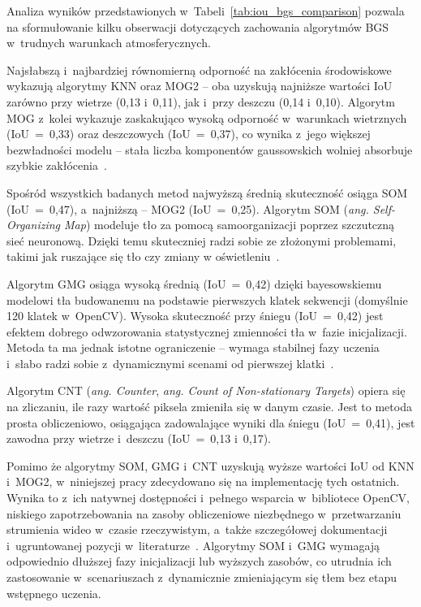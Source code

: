 Analiza wyników przedstawionych w~Tabeli~\ref{tab:iou_bgs_comparison} pozwala na sformułowanie
kilku obserwacji dotyczących zachowania algorytmów BGS w~trudnych warunkach atmosferycznych.

Najsłabszą i~najbardziej równomierną odporność na zakłócenia środowiskowe wykazują algorytmy KNN
oraz MOG2 -- oba uzyskują najniższe wartości IoU zarówno przy wietrze (0,13 i~0,11), jak i~przy
deszczu (0,14 i~0,10). Algorytm MOG z~kolei wykazuje zaskakująco wysoką odporność w~warunkach
wietrznych (IoU~=~0,33) oraz deszczowych (IoU~=~0,37), co wynika z~jego większej bezwładności
modelu -- stała liczba komponentów gaussowskich wolniej absorbuje szybkie
zakłócenia~\cite{stauffer1999}.

Spośród wszystkich badanych metod najwyższą średnią skuteczność osiąga SOM (IoU~=~0,47),
a~najniższą -- MOG2 (IoU~=~0,25). Algorytm SOM (\textit{ang. Self-Organizing Map}) modeluje tło za
pomocą samoorganizacji poprzez szczutczną sieć neuronową\cite{karbowiak2022}. Dzięki temu
skuteczniej radzi sobie ze złożonymi problemami, takimi jak ruszające się tło czy zmiany w
oświetleniu~\cite{karbowiak2022}.

Algorytm GMG osiąga wysoką średnią (IoU~=~0,42) dzięki bayesowskiemu modelowi tła budowanemu na
podstawie pierwszych klatek sekwencji (domyślnie 120 klatek w~OpenCV). Wysoka skuteczność przy
śniegu (IoU~=~0,42) jest efektem dobrego odwzorowania statystycznej zmienności tła w~fazie
inicjalizacji. Metoda ta ma jednak istotne ograniczenie -- wymaga stabilnej fazy uczenia i~słabo
radzi sobie z~dynamicznymi scenami od pierwszej klatki~\cite{karbowiak2022}.

Algorytm CNT (\textit{ang. Counter}, \textit{ang. Count of Non-stationary Targets}) opiera się na
zliczaniu, ile razy wartość piksela zmieniła się w danym czasie. Jest to metoda prosta
obliczeniowo, osiągająca zadowalające wyniki dla śniegu (IoU~=~0,41), jest zawodna przy wietrze
i~deszczu (IoU~=~0,13 i~0,17).

Pomimo że algorytmy SOM, GMG i~CNT uzyskują wyższe wartości IoU od KNN i~MOG2, w~niniejszej pracy
zdecydowano się na implementację tych ostatnich. Wynika to z~ich natywnej dostępności i~pełnego
wsparcia w~bibliotece OpenCV, niskiego zapotrzebowania na zasoby obliczeniowe niezbędnego
w~przetwarzaniu strumienia wideo w~czasie rzeczywistym, a~także szczegółowej dokumentacji
i~ugruntowanej pozycji w~literaturze~\cite{zivkovic2006}. Algorytmy SOM i~GMG wymagają odpowiednio
dłuższej fazy inicjalizacji lub wyższych zasobów, co utrudnia ich zastosowanie w~scenariuszach
z~dynamicznie zmieniającym się tłem bez etapu wstępnego uczenia.

